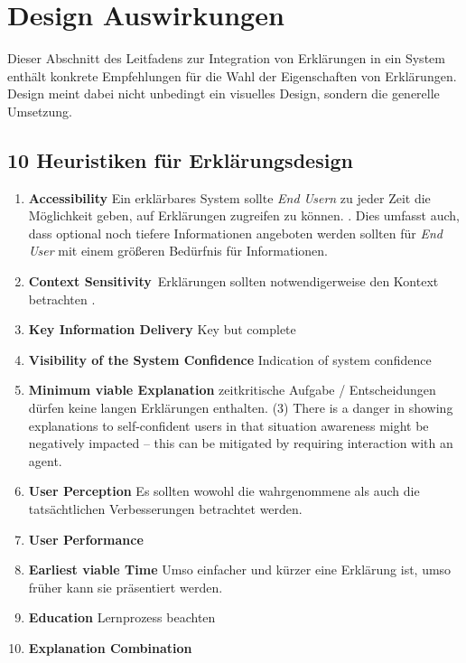 \section{Design Auswirkungen}
\label{sec:model_design_implications}

Dieser Abschnitt des Leitfadens zur Integration von Erklärungen in ein System enthält konkrete Empfehlungen für die Wahl der Eigenschaften von Erklärungen. Design meint dabei nicht unbedingt ein visuelles Design, sondern die generelle Umsetzung.

\subsection{10 Heuristiken für Erklärungsdesign}

\begin{enumerate}
    \item \textbf{Accessibility} Ein erklärbares System sollte \textit{End Usern} zu jeder Zeit die Möglichkeit geben, auf Erklärungen zugreifen zu können. \cite{wiegand2019drive, chazette_end-users_nodate, wiegand_id_2020, weitz_you_2019}. Dies umfasst auch, dass optional noch tiefere Informationen angeboten werden sollten für \textit{End User} mit einem größeren Bedürfnis für Informationen. \cite{martin_evaluating_2021}
    \item \textbf{Context Sensitivity} Erklärungen sollten notwendigerweise den Kontext betrachten \cite{sato_context_nodate, rjoob_towards_2021,chazette_end-users_nodate}. %
    \item \textbf{Key Information Delivery} \cite{martin_evaluating_2021} Key but complete \cite{riveiro_thats_2021}
    \item \textbf{Visibility of the System Confidence} Indication of system confidence \cite{wiegand_id_2020, golledge1999wayfinding}
    \item \textbf{Minimum viable Explanation} \cite{wiegand_id_2020, wiegand2019drive} zeitkritische Aufgabe / Entscheidungen dürfen keine langen Erklärungen enthalten. (3) There is a danger in showing explanations to self-confident users in that situation awareness might be negatively impacted – this can be mitigated by requiring interaction with an agent. \cite{schaffer_i_2019}
    \item \textbf{User Perception} Es sollten wowohl die wahrgenommene als auch die tatsächtlichen Verbesserungen betrachtet werden. \cite{riveiro_thats_2021}
    \item \textbf{User Performance} \cite{riveiro_thats_2021}
    \item \textbf{Earliest viable Time} Umso einfacher und kürzer eine Erklärung ist, umso früher kann sie präsentiert werden. \cite{hleg2019policy, sovrano_modelling_2020}
    \item \textbf{Education} Lernprozess beachten \cite{wang_integration_2020}
    \item \textbf{Explanation Combination} \cite{sato_action-triggering_2019, kunkel_let_2019, sato_action-triggering_2019, schrills_color_2020, lim_2009_assessing}
\end{enumerate}
